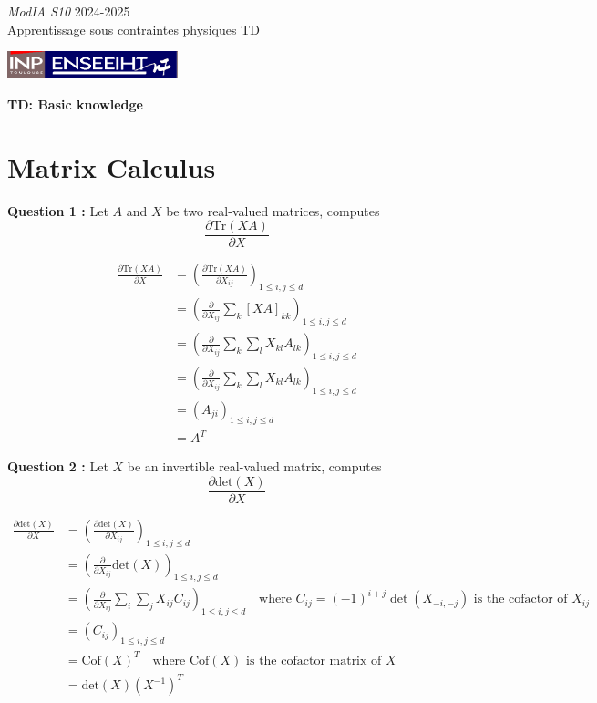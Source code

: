 \documentclass[12pt,a4paper]{article}
\newcommand{\entete}{
    \noindent\textit{ModIA S10} \hfill {2024-2025} \\
    {Apprentissage sous contraintes physiques} \hfill {TD} \\
    \begin{center}
        \includegraphics[height=0.8cm]{src/inp_n7.png}
    \end{center}
    \begin{center}
        \textbf{\LARGE TD: Basic knowledge}
    \end{center}
}
\begin{document}
\entete

\section{Matrix Calculus}

\noindent\textbf{Question 1 :}
Let $A$ and $X$ be two real-valued matrices, computes
$$
\frac{\partial \text{Tr}(XA)}{\partial X}
$$

\color{blue}

\begin{align*}
    \frac{\partial \text{Tr}(XA)}{\partial X} &= \left(\frac{\partial \text{Tr}(XA)}{\partial X_{ij}}\right)_{1\leq i,j\leq d} \\
    &= \left(\frac{\partial}{\partial X_{ij}}\sum_{k}\left[XA\right]_{kk}\right)_{1\leq i,j\leq d} \\
    &= \left(\frac{\partial}{\partial X_{ij}}\sum_{k} \sum_{l}X_{kl}A_{lk}\right)_{1\leq i,j\leq d} \\
    &= \left(\frac{\partial}{\partial X_{ij}}\sum_{k} \sum_{l}X_{kl}A_{lk}\right)_{1\leq i,j\leq d} \\
    &= \left(A_{ji}\right)_{1\leq i,j\leq d} \\
    &= A^T
\end{align*}

\color{black}

\noindent\textbf{Question 2 :}
Let $X$ be an invertible real-valued matrix, computes
$$
\frac{\partial \text{det}(X)}{\partial X}
$$

\color{blue}

\begin{align*}
    \frac{\partial \text{det}(X)}{\partial X} &= \left(\frac{\partial \text{det}(X)}{\partial X_{ij}}\right)_{1\leq i,j\leq d} \\
    &= \left(\frac{\partial}{\partial X_{ij}}\text{det}(X)\right)_{1\leq i,j\leq d} \\
    &= \left(\frac{\partial}{\partial X_{ij}}\sum_i \sum_j X_{ij}C_{ij}\right)_{1\leq i,j\leq d} \quad \text{where } C_{ij} = (-1)^{i+j}\det(X_{-i,-j}) \text{ is the cofactor of } X_{ij} \\
    &= \left(C_{ij}\right)_{1\leq i,j\leq d} \\
    &= \text{Cof}(X)^T \quad \text{where } \text{Cof}(X) \text{ is the cofactor matrix of } X \\
    &= \text{det}(X)(X^{-1})^T
\end{align*}


\color{black}
\end{document}
